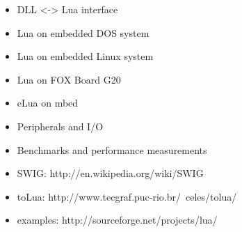 \begin{itemize}
	\item DLL <-> Lua interface
	\item Lua on embedded DOS system
	\item Lua on embedded Linux system
	\item Lua on FOX Board G20
	\item eLua on mbed
	\item Peripherals and I/O
	\item Benchmarks and performance measurements
	\item SWIG: http://en.wikipedia.org/wiki/SWIG
	\item toLua: http://www.tecgraf.puc-rio.br/~celes/tolua/
	\item examples: http://sourceforge.net/projects/lua/
\end{itemize}
